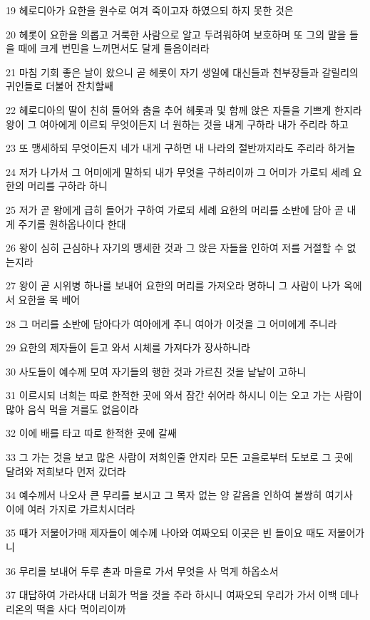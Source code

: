 \par 19 헤로디아가 요한을 원수로 여겨 죽이고자 하였으되 하지 못한 것은
\par 20 헤롯이 요한을 의롭고 거룩한 사람으로 알고 두려워하여 보호하며 또 그의 말을 들을 때에 크게 번민을 느끼면서도 달게 들음이러라
\par 21 마침 기회 좋은 날이 왔으니 곧 헤롯이 자기 생일에 대신들과 천부장들과 갈릴리의 귀인들로 더불어 잔치할쌔
\par 22 헤로디아의 딸이 친히 들어와 춤을 추어 헤롯과 및 함께 앉은 자들을 기쁘게 한지라 왕이 그 여아에게 이르되 무엇이든지 너 원하는 것을 내게 구하라 내가 주리라 하고
\par 23 또 맹세하되 무엇이든지 네가 내게 구하면 내 나라의 절반까지라도 주리라 하거늘
\par 24 저가 나가서 그 어미에게 말하되 내가 무엇을 구하리이까 그 어미가 가로되 세례 요한의 머리를 구하라 하니
\par 25 저가 곧 왕에게 급히 들어가 구하여 가로되 세례 요한의 머리를 소반에 담아 곧 내게 주기를 원하옵나이다 한대
\par 26 왕이 심히 근심하나 자기의 맹세한 것과 그 앉은 자들을 인하여 저를 거절할 수 없는지라
\par 27 왕이 곧 시위병 하나를 보내어 요한의 머리를 가져오라 명하니 그 사람이 나가 옥에서 요한을 목 베어
\par 28 그 머리를 소반에 담아다가 여아에게 주니 여아가 이것을 그 어미에게 주니라
\par 29 요한의 제자들이 듣고 와서 시체를 가져다가 장사하니라
\par 30 사도들이 예수께 모여 자기들의 행한 것과 가르친 것을 낱낱이 고하니
\par 31 이르시되 너희는 따로 한적한 곳에 와서 잠간 쉬어라 하시니 이는 오고 가는 사람이 많아 음식 먹을 겨를도 없음이라
\par 32 이에 배를 타고 따로 한적한 곳에 갈쌔
\par 33 그 가는 것을 보고 많은 사람이 저희인줄 안지라 모든 고을로부터 도보로 그 곳에 달려와 저희보다 먼저 갔더라
\par 34 예수께서 나오사 큰 무리를 보시고 그 목자 없는 양 같음을 인하여 불쌍히 여기사 이에 여러 가지로 가르치시더라
\par 35 때가 저물어가매 제자들이 예수께 나아와 여짜오되 이곳은 빈 들이요 때도 저물어가니
\par 36 무리를 보내어 두루 촌과 마을로 가서 무엇을 사 먹게 하옵소서
\par 37 대답하여 가라사대 너희가 먹을 것을 주라 하시니 여짜오되 우리가 가서 이백 데나리온의 떡을 사다 먹이리이까
